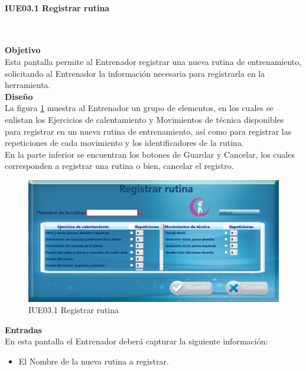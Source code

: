 \paragraph{IUE03.1 Registrar rutina} \hspace{1cm}\\ 
\label{pant:IUE03.1}

\textbf{\textcolor[rgb]{0, 0, 0.545098}{Objetivo}}\\
Esta pantalla permite al Entrenador registrar una nueva rutina de entrenamiento, solicitando al Entrenador la información necesaria para registrarla en la herramienta.\\

\textbf{\textcolor[rgb]{0, 0, 0.545098}{Diseño}}\\
La figura \ref{fig:IUE03.1} muestra al Entrenador un grupo de elementos, en los cuales se enlistan los Ejercicios de calentamiento y Movimientos de técnica disponibles para registrar en un nueva rutina de entrenamiento, así como para registrar las repeticiones de cada movimiento y los identificadores de la rutina.\\

En la parte inferior se encuentran los botones de Guardar y Cancelar, los cuales corresponden a registrar una rutina o bien, cancelar el registro.

\begin{figure}[H]
	\centering
		\includegraphics[scale=0.5]{./Figuras/Pantallas/IUE03_1Registrar_rutina}
	\caption{IUE03.1 Registrar rutina}
	\label{fig:IUE03.1}
\end{figure}

\textbf{\textcolor[rgb]{0, 0, 0.545098}{Entradas}}\\
En esta pantalla el Entrenador deberá capturar la siguiente información:

\begin{itemize}
	\item El Nombre de la nueva rutina a registrar.
\end{itemize}
\vspace{1em}


